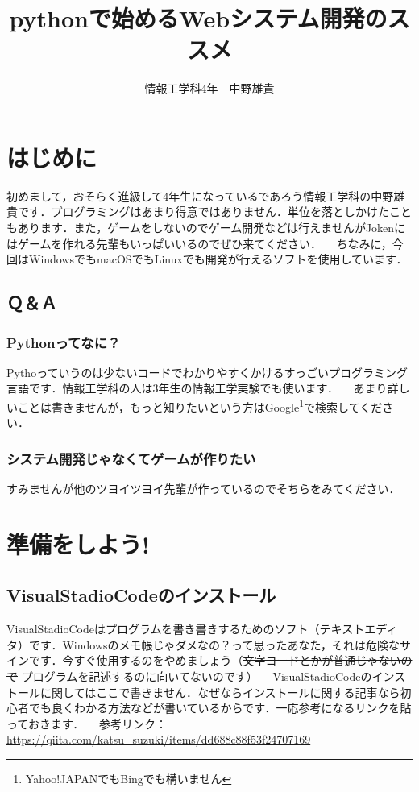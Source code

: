 \documentclass{jsarticle}
\title{pythonで始めるWebシステム開発のススメ}
\author{情報工学科4年　中野雄貴}
\begin{document}
\maketitle
\section{はじめに}
初めまして，おそらく進級して4年生になっているであろう情報工学科の中野雄貴です．プログラミングはあまり得意ではありません．単位を落としかけたこともあります．また，ゲームをしないのでゲーム開発などは行えませんがJokenにはゲームを作れる先輩もいっぱいいるのでぜひ来てください．\newline
　ちなみに，今回はWindowsでもmacOSでもLinuxでも開発が行えるソフトを使用しています．

\subsection{Ｑ＆Ａ}
\subsubsection{Pythonってなに？}
Pythoっていうのは少ないコードでわかりやすくかけるすっごいプログラミング言語です．情報工学科の人は3年生の情報工学実験でも使います．\newline
　あまり詳しいことは書きませんが，もっと知りたいという方はGoogle\footnote{Yahoo!JAPANでもBingでも構いません}で検索してください．

\subsubsection{システム開発じゃなくてゲームが作りたい}
すみませんが他のツヨイツヨイ先輩が作っているのでそちらをみてください．

\section{準備をしよう!}
\subsection{VisualStadioCodeのインストール}
VisualStadioCodeはプログラムを書き書きするためのソフト（テキストエディタ）です．Windowsのメモ帳じゃダメなの？って思ったあなた，それは危険なサインです．今すぐ使用するのをやめましょう（\sout{文字コードとかが普通じゃないので} プログラムを記述するのに向いてないのです）\newline
　VisualStadioCodeのインストールに関してはここで書きません．なぜならインストールに関する記事なら初心者でも良くわかる方法などが書いているからです．一応参考になるリンクを貼っておきます．\newline
　参考リンク：\url{https://qiita.com/katsu_suzuki/items/dd688c88f53f24707169} 
\end{document}
